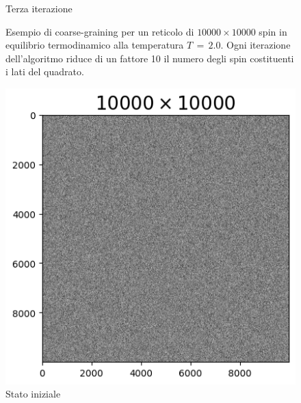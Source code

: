 \begin{figure}[htbp]
\begin{minipage}{0.45\textwidth}
      \caption{Terza iterazione}
    \end{minipage}

    \caption{Esempio di coarse-graining per un reticolo di $10000 \times 10000$ spin in equilibrio termodinamico alla 
    temperatura $T\,=\,2.0$. Ogni iterazione dell'algoritmo riduce di un fattore 10 il numero degli spin costituenti i lati 
    del quadrato.}
    \label{fig: cg_2.0}
\end{figure}

\vspace*{\fill}

\vspace*{\fill}

\begin{figure}[htbp]
    \centering
    \begin{minipage}{0.45\textwidth}  
      \centering
      \includegraphics[page=1, width=\textwidth]{Immagini/simIsing2D/cg/cg_10000_3.0.png}
      \caption{Stato iniziale}
    \end{minipage}\hfill
    \begin{minipage}{0.45\textwidth}  
      \centering

\end{minipage}
\end{figure}

